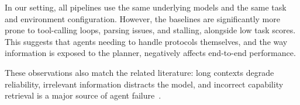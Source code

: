In our setting, all pipelines use the same underlying models and the same task and environment configuration.
However, the baselines are significantly more prone to tool-calling loops, parsing issues, and stalling, alongside low task scores.
This suggests that agents needing to handle protocols themselves, and the way information is exposed to the planner, negatively affects end-to-end performance.

These observations also match the related literature:
long contexts degrade reliability, irrelevant information distracts the model, and incorrect capability retrieval is a major source of agent failure~\cite{liu2023lostmiddlellms, shi2023llmseasily, mo2026livemcpbench, fei2025mcpzero}.
